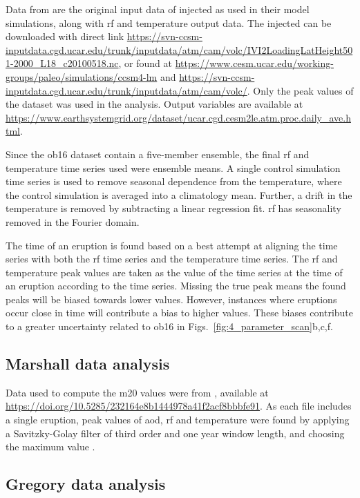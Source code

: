 \documentclass{ametsocV6.1}
\newcommand{\iso}[1][i]{{#1}njected \ce{SO2}}
\begin{document}
Data from \citet{ottobliesner2016} are the original input data of \iso{} as used in
their model simulations, along with \gls{rf} and temperature output data. The \iso{} can
be downloaded with direct link
\url{https://svn-ccsm-inputdata.cgd.ucar.edu/trunk/inputdata/atm/cam/volc/IVI2LoadingLatHeight501-2000_L18_c20100518.nc},
or found at \url{https://www.cesm.ucar.edu/working-groups/paleo/simulations/ccsm4-lm}
and \url{https://svn-ccsm-inputdata.cgd.ucar.edu/trunk/inputdata/atm/cam/volc/}. Only
the peak values of the  dataset was used in the analysis. Output variables are
available at
\url{https://www.earthsystemgrid.org/dataset/ucar.cgd.cesm2le.atm.proc.daily_ave.html}.

Since the \gls{ob16} dataset contain a five-member ensemble, the final \gls{rf} and
temperature time series used were ensemble means. A single control simulation time
series is used to remove seasonal dependence from the temperature, where the control
simulation is averaged into a climatology mean. Further, a drift in the temperature is
removed by subtracting a linear regression fit. \gls{rf} has seasonality removed in the
Fourier domain.

The time of an eruption is found based on a best attempt at aligning the  time
series with both the \gls{rf} time series and the temperature time series. The \gls{rf}
and temperature peak values are taken as the value of the time series at the time of an
eruption according to the  time series. Missing the true peak means the found
peaks will be biased towards lower values. However, instances where eruptions occur
close in time will contribute a bias to higher values. These biases contribute to a
greater uncertainty related to \gls{ob16} in Figs.~\ref{fig:4_parameter_scan}b,c,f.

\subsection{Marshall data analysis}\label{ap:m20}

Data used to compute the \gls{m20} values were from \citet{marshall2020dataset},
available at \url{https://doi.org/10.5285/232164e8b1444978a41f2acf8bbbfe91}. As each
file includes a single eruption, peak values of \gls{aod}, \gls{rf} and temperature were
found by applying a Savitzky-Golay filter of third order and one year window length, and
choosing the maximum value \citep{savitzky1964}.

\subsection{Gregory data analysis}\label{ap:g16}
\end{document}
